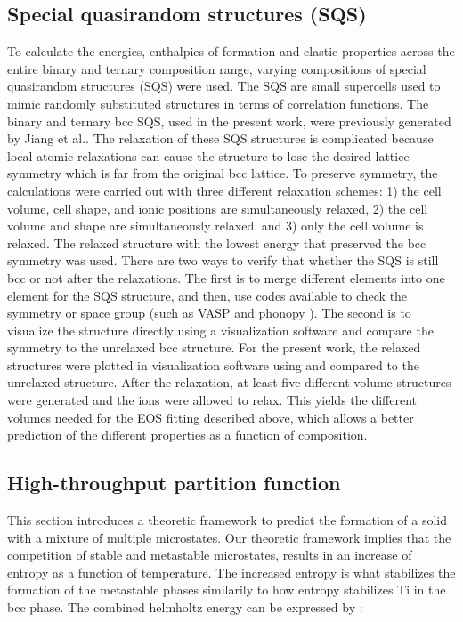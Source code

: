 \subsection{Special quasirandom structures (SQS)}

To calculate the energies, enthalpies of formation and elastic properties across the entire binary and ternary composition range, varying compositions of special quasirandom structures (SQS) were used. The SQS are small supercells used to mimic randomly substituted structures in terms of correlation functions. The binary and ternary bcc SQS, used in the present work, were previously generated by Jiang et al.\cite{Jiang2004,Jiang2009}. The relaxation of these SQS structures is complicated because local atomic relaxations can cause the structure to lose the desired lattice symmetry which is far from the original bcc lattice. To preserve symmetry, the calculations were carried out with three different relaxation schemes: 1) the cell volume, cell shape, and ionic positions are simultaneously relaxed, 2) the cell volume and shape are simultaneously relaxed, and 3) only the cell volume is relaxed. The relaxed structure with the lowest energy that preserved the bcc symmetry was used. There are two ways to verify that whether the SQS is still bcc or not after the relaxations. The first is to merge different elements into one element for the SQS structure, and then, use codes available to check the symmetry or space group (such as VASP \cite{Kresse1999} and phonopy \cite{Togo2008}). The second is to visualize the structure directly using a visualization software and compare the symmetry to the unrelaxed bcc structure. For the present work, the relaxed structures were plotted in visualization software using and compared to the unrelaxed structure. After the relaxation, at least five different volume structures were generated and the ions were allowed to relax. This yields the different volumes needed for the EOS fitting described above, which allows a better prediction of the different properties as a function of composition. 

\subsection{High-throughput partition function}

This section introduces a theoretic framework to predict the formation of a solid with a mixture of multiple microstates. Our theoretic framework implies that the competition of stable and metastable microstates, results in an increase of entropy as a function of temperature. The increased entropy is what stabilizes the formation of the metastable phases similarily to how entropy stabilizes Ti in the bcc phase. The combined helmholtz energy can be expressed by \cite{Liu2016}:

